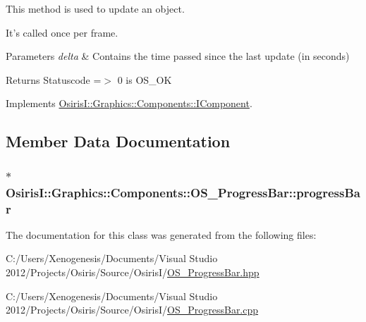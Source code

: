 This method is used to update an object. 

It's called once per frame. 
\begin{DoxyParams}{Parameters}
{\em delta} & Contains the time passed since the last update (in seconds) \\
\hline
\end{DoxyParams}
\begin{DoxyReturn}{Returns}
Statuscode =$>$ 0 is O\-S\-\_\-\-O\-K 
\end{DoxyReturn}


Implements \hyperlink{class_osiris_i_1_1_graphics_1_1_components_1_1_i_component_a9cda60f3e5f8471742471f239a5180b6}{Osiris\-I\-::\-Graphics\-::\-Components\-::\-I\-Component}.



\subsection{Member Data Documentation}
\hypertarget{class_osiris_i_1_1_graphics_1_1_components_1_1_o_s___progress_bar_a57b534d3cf1571b946c4ae81422d9327}{
\subsubsection[{progress\-Bar}]{$\ast$ Osiris\-I\-::\-Graphics\-::\-Components\-::\-O\-S\-\_\-\-Progress\-Bar\-::progress\-Bar\hspace{0.3cm}{\ttfamily [protected]}}}\label{class_osiris_i_1_1_graphics_1_1_components_1_1_o_s___progress_bar_a57b534d3cf1571b946c4ae81422d9327}


The documentation for this class was generated from the following files\-:\begin{DoxyCompactItemize}
\item 
C\-:/\-Users/\-Xenogenesis/\-Documents/\-Visual Studio 2012/\-Projects/\-Osiris/\-Source/\-Osiris\-I/\hyperlink{_o_s___progress_bar_8hpp}{O\-S\-\_\-\-Progress\-Bar.\-hpp}\item 
C\-:/\-Users/\-Xenogenesis/\-Documents/\-Visual Studio 2012/\-Projects/\-Osiris/\-Source/\-Osiris\-I/\hyperlink{_o_s___progress_bar_8cpp}{O\-S\-\_\-\-Progress\-Bar.\-cpp}\end{DoxyCompactItemize}
